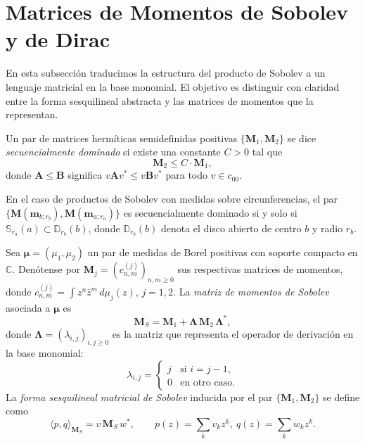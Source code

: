 \section{Matrices de Momentos de Sobolev y de Dirac}\label{sec:momentos_sobolev}

En esta subsección traducimos la estructura del producto de Sobolev a un lenguaje matricial en la base monomial. El objetivo es distinguir con claridad entre la forma sesquilineal abstracta y las matrices de momentos que la representan.

\begin{defn}\label{def:dominacion_secuencial}
	Un par de matrices hermíticas semidefinidas positivas $\{\mathbf{M}_1, \mathbf{M}_2\}$ se dice \emph{secuencialmente dominado} si existe una constante $C > 0$ tal que
	\[
		\mathbf{M}_2 \leq C \cdot \mathbf{M}_1,
	\]
	donde $\mathbf{A} \leq \mathbf{B}$ significa $v \mathbf{A} v^* \leq v \mathbf{B} v^*$ para todo $v \in c_{00}$.
\end{defn}

\begin{rmk}
	En el caso de productos de Sobolev con medidas sobre circunferencias, el par $\{\mathbf{M}(\mathbf{m}_{b;r_b}), \mathbf{M}(\mathbf{m}_{a;r_a})\}$ es secuencialmente dominado si y solo si $\mathbb{S}_{r_a}(a) \subset \mathbb{D}_{r_b}(b)$, donde $\mathbb{D}_{r_b}(b)$ denota el disco abierto de centro $b$ y radio $r_b$.
\end{rmk}

\begin{defn}\label{def:matriz_sobolev}
	Sea $\boldsymbol{\mu} = (\mu_1, \mu_2)$ un par de medidas de Borel positivas con soporte compacto en $\mathbb{C}$. Denótense por $\mathbf{M}_j = (c^{(j)}_{n,m})_{n,m \geq 0}$ sus respectivas matrices de momentos, donde $c^{(j)}_{n,m} = \int z^n \bar{z}^m \, d\mu_j(z)$, $j = 1, 2$. La \emph{matriz de momentos de Sobolev} asociada a $\boldsymbol{\mu}$ es
	\[
		\mathbf{M}_S = \mathbf{M}_1 + \boldsymbol{\Lambda}\, \mathbf{M}_2\, \boldsymbol{\Lambda}^*,
	\]
	donde $\boldsymbol{\Lambda} = (\lambda_{i,j})_{i,j \geq 0}$ es la matriz que representa el operador de derivación en la base monomial:
	\[
		\lambda_{i,j} = \begin{cases} j & \text{si } i = j - 1, \\ 0 & \text{en otro caso.} \end{cases}
	\]
	La \emph{forma sesquilineal matricial de Sobolev} inducida por el par $\{\mathbf{M}_1, \mathbf{M}_2\}$ se define como
	\[
		\langle p, q \rangle_{\mathbf{M}_S} = v\, \mathbf{M}_S\, w^*, \qquad p(z) = \sum_k v_k z^k,\ q(z) = \sum_k w_k z^k.
	\]
\end{defn}

